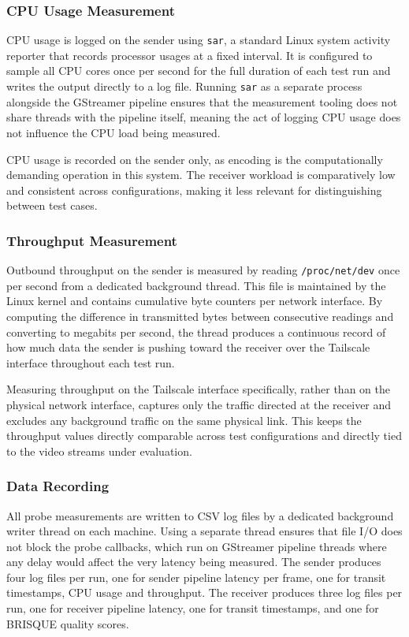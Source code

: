 \subsubsection{CPU Usage Measurement}

CPU usage is logged on the sender using \texttt{sar}, a standard Linux system activity reporter that records processor usages at a fixed interval. It is configured to sample all CPU cores once per second for the full duration of each test run and writes the output directly to a log file. Running \texttt{sar} as a separate process alongside the GStreamer pipeline ensures that the measurement tooling does not share threads with the pipeline itself, meaning the act of logging CPU usage does not influence the CPU load being measured.

CPU usage is recorded on the sender only, as encoding is the computationally demanding operation in this system. The receiver workload is comparatively low and consistent across configurations, making it less relevant for distinguishing between test cases.

\subsubsection{Throughput Measurement}

Outbound throughput on the sender is measured by reading \texttt{/proc/net/dev} once per second from a dedicated background thread. This file is maintained by the Linux kernel and contains cumulative byte counters per network interface. By computing the difference in transmitted bytes between consecutive readings and converting to megabits per second, the thread produces a continuous record of how much data the sender is pushing toward the receiver over the Tailscale interface throughout each test run.

Measuring throughput on the Tailscale interface specifically, rather than on the physical network interface, captures only the traffic directed at the receiver and excludes any background traffic on the same physical link. This keeps the throughput values directly comparable across test configurations and directly tied to the video streams under evaluation.

\subsubsection{Data Recording}

All probe measurements are written to CSV log files by a dedicated background writer thread on each machine. Using a separate thread ensures that file I/O does not block the probe callbacks, which run on GStreamer pipeline threads where any delay would affect the very latency being measured. The sender produces four log files per run, one for sender pipeline latency per frame, one for transit timestamps, CPU usage and throughput. The receiver produces three log files per run, one for receiver pipeline latency, one for transit timestamps, and one for BRISQUE quality scores.